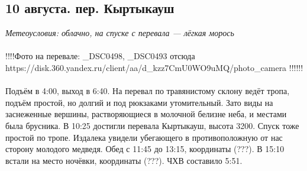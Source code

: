 \subsection{10 августа. пер. Кыртыкауш}
\textit{Метеоусловия: облачно, на спуске с перевала — лёгкая морось}
\\\\
!!!!Фото на перевале: _DSC0498, _DSC0493 отсюда https://disk.360.yandex.ru/client/aa/d_kzz7CmU0WO9uMQ/photo_camera !!!!!!\\\\
Подъём в 4:00, выход в 6:40. На перевал по травянистому склону ведёт тропа, подъём простой, но долгий и под рюкзаками утомительный. Зато виды на заснеженные вершины, растворяющиеся в молочной белизне неба, и местами была брусника. В 10:25 достигли перевала Кыртыкауш, высота 3200. Спуск тоже простой по тропе. Издалека увидели убегающего в противоположную от нас сторону молодого медведя. Обед с 11:45 до 13:15, координаты (???). В 15:10 встали на место ночёвки, координаты (???). ЧХВ составило 5:51.







\clearpage
